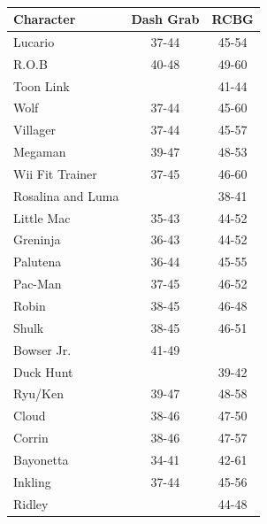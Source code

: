 \begin{table}[h]
\begin{subtable}[t]{.45\linewidth}
\begin{tablenotes}
        \end{tablenotes}
    \end{subtable}
    \begin{subtable}[t]{.45\linewidth}
        \centering
        \caption{}
        \begin{tabular}{lcc}
            \toprule
            \textbf{Character} & \textbf{Dash Grab} & \textbf{RCBG} \\
            \midrule
            Lucario           & 37-44          & 45-54 \\
            R.O.B             & 40-48\tnote{1} & 49-60\tnote{3} \\
            Toon Link         &                & 41-44 \\
            Wolf              & 37-44          & 45-60 \\
            Villager          & 37-44          & 45-57 \\
            Megaman           & 39-47          & 48-53 \\
            Wii Fit Trainer   & 37-45          & 46-60 \\
            Rosalina and Luma &                & 38-41\tnote{5} \\
            Little Mac        & 35-43\tnote{1} & 44-52 \\
            Greninja          & 36-43          & 44-52 \\
            Palutena          & 36-44          & 45-55 \\
            Pac-Man           & 37-45          & 46-52 \\
            Robin             & 38-45          & 46-48 \\
            Shulk             & 38-45\tnote{2} & 46-51\tnote{2} \\
            Bowser Jr.        & 41-49          &       \\
            Duck Hunt         &                & 39-42\tnote{4} \\
            Ryu/Ken           & 39-47\tnote{1} & 48-58 \\
            Cloud             & 38-46          & 47-50 \\
            Corrin            & 38-46          & 47-57 \\
            Bayonetta         & 34-41          & 42-61 \\
            Inkling           & 37-44          & 45-56 \\
            Ridley            &                & 44-48 \\

\end{tabular}
\end{subtable}
\end{table}
